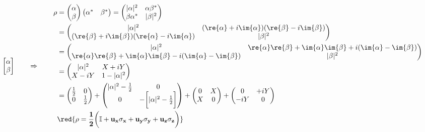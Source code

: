   \begin{equation}
  \begin{bmatrix}
  \alpha\\\beta
  \end{bmatrix} \qquad\Rightarrow\qquad \begin{aligned}
  \rho & = \begin{pmatrix}
  \alpha\\\beta
  \end{pmatrix}\begin{pmatrix}
  \alpha^* & \beta^*
  \end{pmatrix} = \begin{pmatrix}
  |\alpha|^2 & \alpha\beta^*\\\beta\alpha^*&|\beta|^2
  \end{pmatrix}\\
  & = \begin{pmatrix}
  |\alpha|^2 & (\re{\alpha}+i\im{\alpha})(\re{\beta}-i\im{\beta})\\ (\re{\beta}+i\im{\beta})(\re{\alpha}-i\im{\alpha}) & |\beta|^2\\
  \end{pmatrix}\\
  & = \begin{pmatrix}
  |\alpha|^2 & \re{\alpha}\re{\beta} +\im{\alpha}\im{\beta} +i(\im{\alpha}-\im{\beta})\\ \re{\alpha}\re{\beta} + \im{\alpha}\im{\beta} -i(\im{\alpha}-\im{\beta}) & |\beta|^2\\
  \end{pmatrix}\\
  & = \begin{pmatrix}
  |\alpha|^2 & X + iY\\ X - iY & 1-|\alpha|^2\\
  \end{pmatrix}\\
  & =  \begin{pmatrix}
  \frac{1}{2} & 0\\0&\frac{1}{2}
  \end{pmatrix} + \begin{pmatrix}
  |\alpha|^2-\frac{1}{2} & 0\\0 & -\bigg[|\alpha|^2-\frac{1}{2}\bigg]
  \end{pmatrix}+ \begin{pmatrix}
  0 & X\\X&0
  \end{pmatrix} + \begin{pmatrix}
  0 & +iY\\-iY&0
  \end{pmatrix}\\
  & \mathbf{\red{\rho = \frac{1}{2}\bigg(\mathbb{I} + u_x\sigma_x+u_y\sigma_y+u_z\sigma_z\bigg)}}
  \end{aligned}
  \end{equation}
  
  
  \newpage
